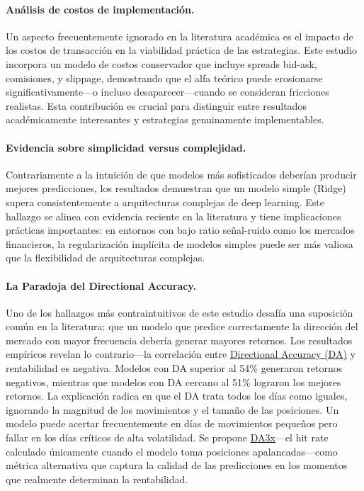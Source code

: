 \documentclass[11pt,a4paper]{article}
\newcommand{\gterm}[2]{\hyperref[glos:#1]{#2}}
\begin{document}
\paragraph*{Análisis de costos de implementación.} Un aspecto frecuentemente ignorado en la literatura académica es el impacto de los costos de transacción en la viabilidad práctica de las estrategias. Este estudio incorpora un modelo de costos conservador que incluye spreads bid-ask, comisiones, y slippage, demostrando que el alfa teórico puede erosionarse significativamente---o incluso desaparecer---cuando se consideran fricciones realistas. Esta contribución es crucial para distinguir entre resultados académicamente interesantes y estrategias genuinamente implementables.

\paragraph*{Evidencia sobre simplicidad versus complejidad.} Contrariamente a la intuición de que modelos más sofisticados deberían producir mejores predicciones, los resultados demuestran que un modelo simple (Ridge) supera consistentemente a arquitecturas complejas de deep learning. Este hallazgo se alinea con evidencia reciente en la literatura \citep{zeng2023} y tiene implicaciones prácticas importantes: en entornos con bajo ratio señal-ruido como los mercados financieros, la regularización implícita de modelos simples puede ser más valiosa que la flexibilidad de arquitecturas complejas.

\paragraph*{La Paradoja del Directional Accuracy.} Uno de los hallazgos más contraintuitivos de este estudio desafía una suposición común en la literatura: que un modelo que predice correctamente la dirección del mercado con mayor frecuencia debería generar mayores retornos. Los resultados empíricos revelan lo contrario---la correlación entre \gterm{da}{Directional Accuracy (DA)} y rentabilidad es negativa. Modelos con DA superior al 54\% generaron retornos negativos, mientras que modelos con DA cercano al 51\% lograron los mejores retornos. La explicación radica en que el DA trata todos los días como iguales, ignorando la magnitud de los movimientos y el tamaño de las posiciones. Un modelo puede acertar frecuentemente en días de movimientos pequeños pero fallar en los días críticos de alta volatilidad. Se propone \gterm{da3x}{DA3x}---el hit rate calculado únicamente cuando el modelo toma posiciones apalancadas---como métrica alternativa que captura la calidad de las predicciones en los momentos que realmente determinan la rentabilidad.
\end{document}
